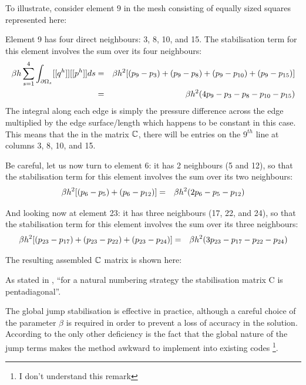 To illustrate, consider element $9$ in the mesh consisting of equally  sized squares represented here:
\begin{center}

\end{center}
Element 9 has four direct neighbours: 3, 8, 10, and 15.
The stabilisation term for this element involves the sum over its four neighbours:
\begin{eqnarray}
\beta h \sum_{s=1}^{4} \int_{\partial \Omega_s}[[ q^h ]]  [[p^h ]] ds
&=& \beta h^2 [ (p_9-p_3)+(p_9-p_8)+(p_9-p_{10})+(p_9-p_{15})   ]  \nonumber\\
&=& \beta h^2 ( 4 p_9-p_3 -p_8-p_{10} -p_{15})  \nonumber
\end{eqnarray}
The integral along each edge is simply the pressure difference across the edge 
multiplied by the edge surface/length which happens to be constant in this case.
This means that the in the matrix ${\mathbb{C}}$, there will be entries on the $9^{th}$
line at columns 3, 8, 10, and 15. 

Be careful, let us now turn to element 6: it has 2 neighbours (5 and 12), so that
the stabilisation term for this element involves the sum over its two neighbours:
\begin{eqnarray}
 \beta h^2 [ (p_6-p_5)+(p_6-p_{12})  ]  
&=& \beta h^2 ( 2 p_6-p_5 -p_{12} )  \nonumber
\end{eqnarray}

And looking now at element 23: it has three neighbours (17, 22, and 24), so that 
the stabilisation term for this element involves the sum over its three neighbours:
\begin{eqnarray}
\beta h^2 [ (p_{23}-p_{17})+(p_{23}-p_{22}) +(p_{23}-p_{24})  ] 
&=& \beta h^2 ( 3 p_{23}-p_{17} -p_{22} - p_{24} )  \nonumber
\end{eqnarray}

The resulting assembled ${\mathbb{C}}$ matrix is shown here:
\begin{center}

\end{center}
As stated in \cite{sike90}, ``for a natural numbering strategy the stabilisation matrix C is pentadiagonal''.

The global jump stabilisation is effective in practice, although a careful choice of the parameter $\beta$ is required in order to prevent a loss of accuracy in the solution. According to \textcite{sike90} the only other deficiency is the fact that the global nature of the jump terms makes the method awkward to implement into existing codes \footnote{I don't understand this remark}.


